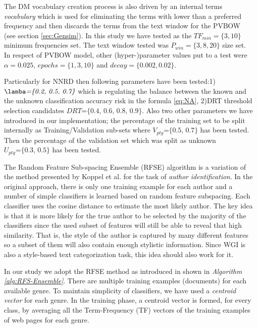 The DM vocabulary creation process is also driven by an internal terms \textit{vocabulary} which is used for eliminating the terms with lower than a preferred frequency and then discards the terms from the text window for the PVBOW (see section \ref{sec:Gensim}). In this study we have tested as the $TF_{min}=\{3,10\}$ minimum frequencies set. The text window tested was $P_{win}=\{3,8,20\}$ size set. In respect of PVBOW model, other (hyper-)parameter values put to a test were $\alpha=0.025$, $epochs=\{1, 3, 10\}$ and $decay=\{0.002, 0.02\}$.

Particularly for NNRD then following parameters have been tested:1) $\lamba\textit{=\{0.2, 0.5, 0.7\}}$ which is regulating the balance between the known and the unknown classification accuracy risk in the formula \ref{eq:NA}, 2)DRT threshold selection candidates $DRT\textit{=\{0.4, 0.6, 0.8, 0.9\}}$. Also two other parameters we have introduced in our implementation; the percentage of the training set to be split internally as Training/Validation sub-sets where $V_{ptg}\textit{=\{0.5, 0.7\}}$ has been tested. Then the percentage of the validation set which was split as unknown $U_{ptg}\textit{=\{0.3, 0.5\}}$ has been tested.

The Random Feature Sub-spacing Ensemble (RFSE) algorithm is a variation of the method presented by Koppel et al.  for the task of \textit{author identification}. In the original approach, there is only one training example for each author and a number of simple classifiers is learned based on random feature subspacing. Each classifier uses the cosine distance to estimate the most likely author. The key idea is that it is more likely for the true author to be selected by the majority of the classifiers since the used subset of features will still be able to reveal that high similarity.  That is, the style of the author is captured by many different features so a subset of them will also contain enough stylistic information. Since WGI is also a style-based text categorization task, this idea should also work for it.

In our study we adopt the RFSE method as introduced in  shown in \textit{Algorithm \ref{alg:RFS-Ensemble}}. There are multiple training examples (documents) for each available genre. To maintain simplicity of classifiers, we have used a \textit{centroid vector} for each genre. In the training phase, a centroid vector is formed, for every class, by averaging all the Term-Frequency (TF) vectors  of the training examples of web pages for each genre.

